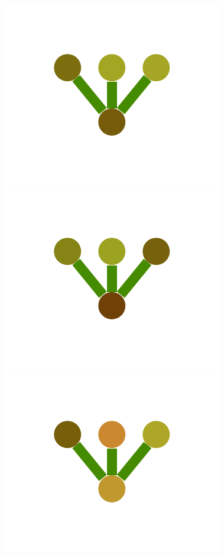 \documentclass[a4paper,10pt]{article}
\begin{document}
\begin{figure}
{    \includegraphics[scale=.2]{../figures/vector/6-2-multiple-color-flower-induced-3.pdf}
    \includegraphics[scale=.2]{../figures/vector/6-2-multiple-color-flower-induced-4.pdf}
    \includegraphics[scale=.2]{../figures/vector/6-2-multiple-color-flower-induced-5.pdf}
}
\end{figure}
\end{document}
